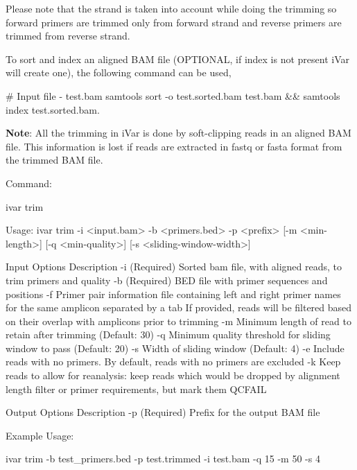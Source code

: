Please note that the strand is taken into account while doing the trimming so forward primers are trimmed only from forward strand and reverse primers are trimmed from reverse strand.

To sort and index an aligned B\+AM file (O\+P\+T\+I\+O\+N\+AL, if index is not present i\+Var will create one), the following command can be used,


\begin{DoxyCode}
# Input file - test.bam
samtools sort -o test.sorted.bam test.bam && samtools index test.sorted.bam.
\end{DoxyCode}


{\bfseries Note}\+: All the trimming in i\+Var is done by soft-\/clipping reads in an aligned B\+AM file. This information is lost if reads are extracted in fastq or fasta format from the trimmed B\+AM file.

Command\+:


\begin{DoxyCode}
ivar trim

Usage: ivar trim -i <input.bam> -b <primers.bed> -p <prefix> [-m <min-length>] [-q <min-quality>] [-s
       <sliding-window-width>]

Input Options    Description
           -i    (Required) Sorted bam file, with aligned reads, to trim primers and quality
           -b    (Required) BED file with primer sequences and positions
           -f    Primer pair information file containing left and right primer names for the same amplicon
       separated by a tab
                 If provided, reads will be filtered based on their overlap with amplicons prior to
       trimming
           -m    Minimum length of read to retain after trimming (Default: 30)
           -q    Minimum quality threshold for sliding window to pass (Default: 20)
           -s    Width of sliding window (Default: 4)
           -e    Include reads with no primers. By default, reads with no primers are excluded
           -k    Keep reads to allow for reanalysis: keep reads which would be dropped by
                 alignment length filter or primer requirements, but mark them QCFAIL

Output Options   Description
           -p    (Required) Prefix for the output BAM file
\end{DoxyCode}


Example Usage\+:


\begin{DoxyCode}
ivar trim -b test\_primers.bed -p test.trimmed -i test.bam -q 15 -m 50 -s 4
\end{DoxyCode}



